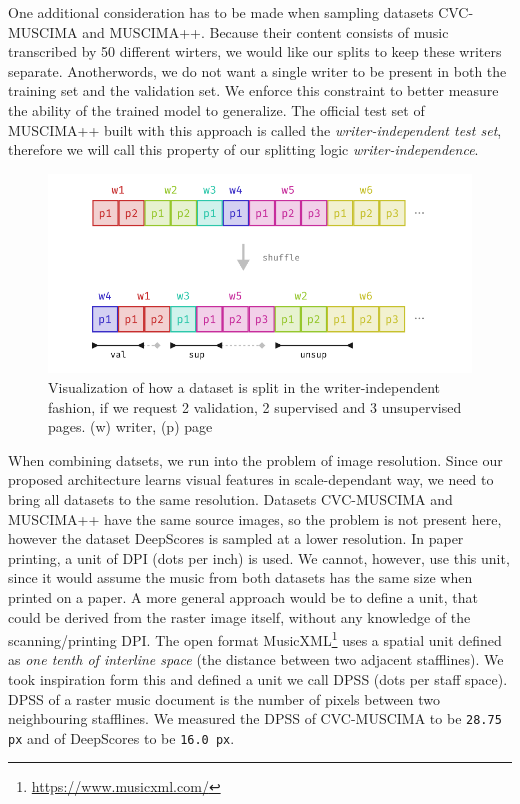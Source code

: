 One additional consideration has to be made when sampling datasets CVC-MUSCIMA and MUSCIMA++. Because their content consists of music transcribed by 50 different wirters, we would like our splits to keep these writers separate. Anotherwords, we do not want a single writer to be present in both the training set and the validation set. We enforce this constraint to better measure the ability of the trained model to generalize. The official test set of MUSCIMA++ built with this approach is called the \emph{writer-independent test set}, therefore we will call this property of our splitting logic \emph{writer-independence}.

\begin{figure}[ht]
    \centering
    \includegraphics[width=140mm]{../img/dataset-splitting.pdf}
    \caption{Visualization of how a dataset is split in the writer-independent fashion, if we request 2 validation, 2 supervised and 3 unsupervised pages. (w) writer, (p) page}
    \label{fig:DatasetSplitting}
\end{figure}

When combining datsets, we run into the problem of image resolution. Since our proposed architecture learns visual features in scale-dependant way, we need to bring all datasets to the same resolution. Datasets CVC-MUSCIMA and MUSCIMA++ have the same source images, so the problem is not present here, however the dataset DeepScores is sampled at a lower resolution. In paper printing, a unit of DPI (dots per inch) is used. We cannot, however, use this unit, since it would assume the music from both datasets has the same size when printed on a paper. A more general approach would be to define a unit, that could be derived from the raster image itself, without any knowledge of the scanning/printing DPI. The open format MusicXML\footnote{\url{https://www.musicxml.com/}} uses a spatial unit defined as \emph{one tenth of interline space} (the distance between two adjacent stafflines). We took inspiration form this and defined a unit we call DPSS (dots per staff space). DPSS of a raster music document is the number of pixels between two neighbouring stafflines. We measured the DPSS of CVC-MUSCIMA to be \verb`28.75 px` and of DeepScores to be \verb`16.0 px`.

